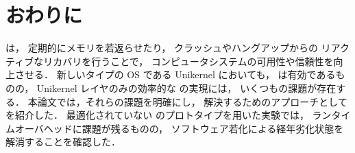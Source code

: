 \section{おわりに} \label{sec:conclusion}

\rr は，
定期的にメモリを若返らせたり，
クラッシュやハングアップからの
リアクティブなリカバリを行うことで，
コンピュータシステムの可用性や信頼性を向上させる．
新しいタイプの OS である Unikernel においても，
\rr は有効であるものの，
Unikernel レイヤのみの効率的な \rr の実現には，
いくつもの課題が存在する．
本論文では，それらの課題を明確にし，
解決するためのアプローチとして \sysname を紹介した．
最適化されていない \sysname のプロトタイプを用いた実験では，
ランタイムオーバヘッドに課題が残るものの，
ソフトウェア若化による経年劣化状態を解消することを確認した．

